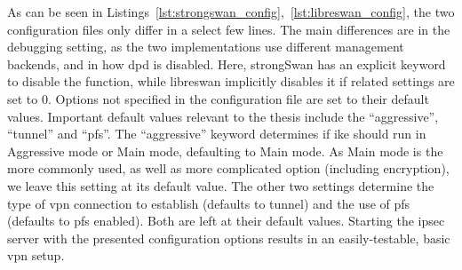 As can be seen in Listings~\ref{lst:strongswan_config},~\ref{lst:libreswan_config}, the two configuration files only differ in a select few lines. The main differences are in the debugging setting, as the two implementations use different management backends, and in how \ac{dpd} is disabled. Here, strongSwan has an explicit keyword to disable the function, while libreswan implicitly disables it if related settings are set to 0. Options not specified in the configuration file are set to their default values. Important default values relevant to the thesis include the ``aggressive'', ``tunnel'' and ``pfs''. The ``aggressive'' keyword determines if \ac{ike} should run in Aggressive mode or Main mode, defaulting to Main mode. As Main mode is the more commonly used, as well as more complicated option (including encryption), we leave this setting at its default value. The other two settings determine the type of \ac{vpn} connection to establish (defaults to tunnel) and the use of \ac{pfs} (defaults to \ac{pfs} enabled). Both are left at their default values. Starting the \ac{ipsec} server with the presented configuration options results in an easily-testable, basic \ac{vpn} setup.


